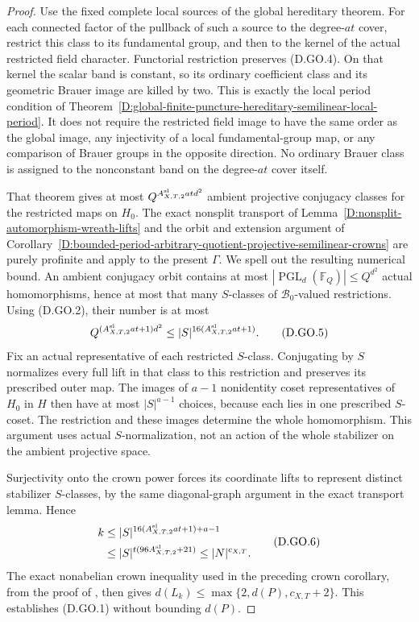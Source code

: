 \begin{proof}
Use the fixed complete local sources of the global
hereditary theorem. For each connected factor of
the pullback of such a source to the degree-$at$
cover, restrict this class to its fundamental group,
and then to the kernel of the actual restricted
field character. Functorial restriction preserves
(D.GO.4). On that kernel the scalar band is constant,
so its ordinary coefficient class and its geometric
Brauer image are killed by two.
This is exactly the local period condition of
Theorem~\ref{D:global-finite-puncture-hereditary-semilinear-local-period}.
It does not require the restricted field image to
have the same order as the global image, any
injectivity of a local fundamental-group map,
or any comparison of Brauer groups in the opposite
direction. No ordinary Brauer class is assigned to
the nonconstant band on the degree-$at$ cover itself.

That theorem gives at most
$Q^{A^{\rm sl}_{X,T,2}atd^2}$ ambient projective
conjugacy classes for the restricted maps on $H_0$.
The exact nonsplit transport of
Lemma~\ref{D:nonsplit-automorphism-wreath-lifts}
and the orbit and extension argument of
Corollary~\ref{D:bounded-period-arbitrary-quotient-projective-semilinear-crowns}
are purely profinite and apply to the present
$\Gamma$. We spell out the resulting numerical
bound. An ambient conjugacy orbit contains at most
$|\operatorname{PGL}_d(\mathbb F_Q)|\le Q^{d^2}$
actual homomorphisms, hence at most that many
$S$-classes of $\mathcal B_0$-valued restrictions.
Using (D.GO.2), their number is at most
\[
 Q^{(A^{\rm sl}_{X,T,2}at+1)d^2}
       \le |S|^{16(A^{\rm sl}_{X,T,2}at+1)}.             \tag{D.GO.5}
\]
Fix an actual representative of each restricted
$S$-class. Conjugating by $S$ normalizes every full
lift in that class to this restriction and preserves
its prescribed outer map. The images of $a-1$
nonidentity coset representatives of $H_0$ in $H$
then have at most $|S|^{a-1}$ choices, because each
lies in one prescribed $S$-coset. The restriction
and these images determine the whole homomorphism.
This argument uses actual $S$-normalization, not
an action of the whole stabilizer on the ambient
projective space.

Surjectivity onto the crown power forces its
coordinate lifts to represent distinct stabilizer
$S$-classes, by the same diagonal-graph argument
in the exact transport lemma. Hence
\[
 \begin{aligned}
 k&\le |S|^{16(A^{\rm sl}_{X,T,2}at+1)+a-1}\\
  &\le |S|^{t(96A^{\rm sl}_{X,T,2}+21)}
   \le |N|^{c_{X,T}}.
 \end{aligned}                                              \tag{D.GO.6}
\]
The exact nonabelian crown inequality used in the
preceding crown corollary, from the proof of
\citet[Proposition~2.6(ii), equations~(2.1)--(2.2),
pp.~11--13]{LucchiniMarionTracey2020D}, then gives
$d(L_k)\le\max\{2,d(P),c_{X,T}+2\}$.
This establishes (D.GO.1) without bounding $d(P)$.
\end{proof}


